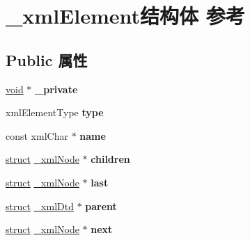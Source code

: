 \hypertarget{struct__xml_element}{}\section{\+\_\+xml\+Element结构体 参考}
\label{struct__xml_element}
\subsection*{Public 属性}
\begin{DoxyCompactItemize}
\item 
\mbox{\label{struct__xml_element_a1771412a687f3fa1ab248c62ed486d0b}} 
\hyperlink{interfacevoid}{void} $\ast$ {\bfseries \+\_\+private}
\item 
\mbox{\label{struct__xml_element_ac73d23a5babfe6a4c48154cece65cecb}} 
xml\+Element\+Type {\bfseries type}
\item 
\mbox{\label{struct__xml_element_a2aeca065453944e7eeedf8c7622660b9}} 
const xml\+Char $\ast$ {\bfseries name}
\item 
\mbox{\label{struct__xml_element_a9a61f0ef96d83c54c78fc8c44a3f17df}} 
\hyperlink{interfacestruct}{struct} \hyperlink{struct__xml_node}{\+\_\+xml\+Node} $\ast$ {\bfseries children}
\item 
\mbox{\label{struct__xml_element_abd8e4a7d4c80a883edfd5a694e029b8c}} 
\hyperlink{interfacestruct}{struct} \hyperlink{struct__xml_node}{\+\_\+xml\+Node} $\ast$ {\bfseries last}
\item 
\mbox{\label{struct__xml_element_a6e82cf8a8a00afdf1facbe0d95f8c691}} 
\hyperlink{interfacestruct}{struct} \hyperlink{struct__xml_dtd}{\+\_\+xml\+Dtd} $\ast$ {\bfseries parent}
\item 
\mbox{\label{struct__xml_element_ae8e3606454fe2af6d20c073a1d3045ab}} 
\hyperlink{interfacestruct}{struct} \hyperlink{struct__xml_node}{\+\_\+xml\+Node} $\ast$ {\bfseries next}
\item 
\mbox{\label{struct__xml_element_a6de172fb1891a78067d27b8680d493a0}} 

\end{DoxyCompactItemize}
